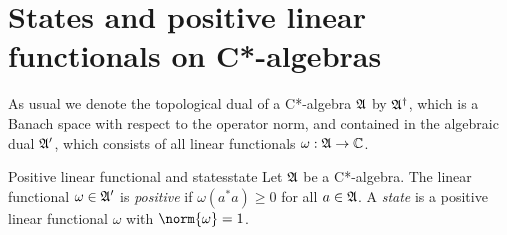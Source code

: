 \section{States and positive linear functionals on C*-algebras}
As usual we denote the topological dual of a C*-algebra \(\mathfrak{A}\) by \(\mathfrak{A}^\dag\), which is a Banach space with respect to the operator norm, and contained in the algebraic dual \(\mathfrak{A}'\), which consists of all linear functionals \(\omega : \mathfrak{A} \to \mathbb{C}\).
\begin{definition}{Positive linear functional and states}{state}
    Let \(\mathfrak{A}\) be a C*-algebra. The linear functional \(\omega \in \mathfrak{A}'\) is \emph{positive} if \(\omega(a^*a) \geq 0\) for all \(a \in \mathfrak{A}\). A \emph{state} is a positive linear functional \(\omega\) with \(\norm{\omega} = 1\).
\end{definition}

